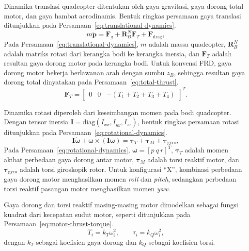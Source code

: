 \documentclass[12pt,a4paper]{report}
\begin{document}
Dinamika translasi quadcopter ditentukan oleh gaya gravitasi, gaya dorong total motor, dan gaya hambat aerodinamis. Bentuk ringkas persamaan gaya translasi ditunjukkan pada Persamaan~\ref{eq:translational-dynamics}.
\begin{equation}
    m\ddot{\mathbf{p}} = \mathbf{F}_g + \mathbf{R}_{B}^{N}\mathbf{F}_T + \mathbf{F}_{\mathrm{drag}},
    \label{eq:translational-dynamics}
\end{equation}
Pada Persamaan~\ref{eq:translational-dynamics}, $m$ adalah massa quadcopter, $\mathbf{R}_{B}^{N}$ adalah matriks rotasi dari kerangka bodi ke kerangka inersia, dan $\mathbf{F}_T$ adalah resultan gaya dorong motor pada kerangka bodi. Untuk konvensi FRD, gaya dorong motor bekerja berlawanan arah dengan sumbu $z_B$, sehingga resultan gaya dorong total dinyatakan pada Persamaan~\ref{eq:total-thrust}.
\begin{equation}
    \mathbf{F}_T =
    \begin{bmatrix}
        0 & 0 & -(T_1+T_2+T_3+T_4)
    \end{bmatrix}^{T}.
    \label{eq:total-thrust}
\end{equation}

Dinamika rotasi diperoleh dari keseimbangan momen pada bodi quadcopter. Dengan tensor inersia $\mathbf{I}=\mathrm{diag}(I_{xx},I_{yy},I_{zz})$, bentuk ringkas persamaan rotasi ditunjukkan pada Persamaan~\ref{eq:rotational-dynamics}.
\begin{equation}
    \mathbf{I}\dot{\boldsymbol{\omega}} + \boldsymbol{\omega}\times(\mathbf{I}\boldsymbol{\omega})
    = \boldsymbol{\tau}_{T} + \boldsymbol{\tau}_{M} + \boldsymbol{\tau}_{\mathrm{gyro}},
    \label{eq:rotational-dynamics}
\end{equation}
Pada Persamaan~\ref{eq:rotational-dynamics}, $\boldsymbol{\omega}=[p\ q\ r]^T$, $\boldsymbol{\tau}_{T}$ adalah momen akibat perbedaan gaya dorong antar motor, $\boldsymbol{\tau}_{M}$ adalah torsi reaktif motor, dan $\boldsymbol{\tau}_{\mathrm{gyro}}$ adalah torsi giroskopik rotor. Untuk konfigurasi ``X'', kombinasi perbedaan gaya dorong motor menghasilkan momen \textit{roll} dan \textit{pitch}, sedangkan perbedaan torsi reaktif pasangan motor menghasilkan momen \textit{yaw}.

Gaya dorong dan torsi reaktif masing-masing motor dimodelkan sebagai fungsi kuadrat dari kecepatan sudut motor, seperti ditunjukkan pada Persamaan~\ref{eq:motor-thrust-torque}.
\begin{equation}
    T_i = k_T\omega_i^2, \qquad \tau_i = k_Q\omega_i^2,
    \label{eq:motor-thrust-torque}
\end{equation}
dengan $k_T$ sebagai koefisien gaya dorong dan $k_Q$ sebagai koefisien torsi. 
\end{document}
